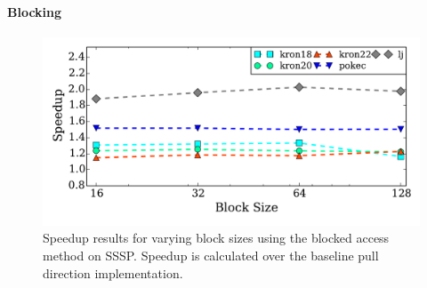  
\paragraph{Blocking}
\begin{figure}[t]
    \centering
    \includegraphics[scale=0.5]{graphit-figures/sssp-block.pdf}
    \caption{Speedup results for varying block sizes using the blocked access method on SSSP. Speedup is calculated over the baseline pull direction implementation.}
    \label{pap:generals:sec:eval:fig:ssspblock}
\end{figure}
 

